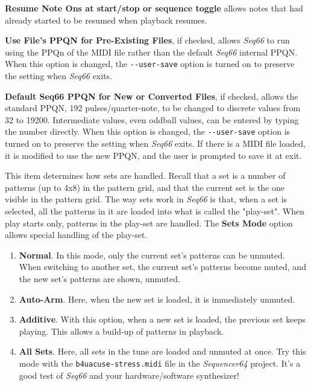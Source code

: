    \setcounter{ItemCounter}{0}      %

   \textbf{Resume Note Ons at start/stop or sequence toggle}
   allows notes that had already started
   to be resumed when playback resumes.

   \textbf{Use File's PPQN for Pre-Existing Files}, if checked, allows
   \textsl{Seq66} to run using the PPQn of the MIDI file rather than
   the default \textsl{Seq66} internal PPQN.
   When this option is changed, the \texttt{-{}-user-save} option is turned on
   to preserve the setting when \textsl{Seq66} exits.

   \textbf{Default Seq66 PPQN for New or Converted Files}, if checked, allows
   the standard PPQN, 192 pulses/quarter-note, to be changed to discrete values
   from 32 to 19200.  Intermediate values, even oddball values, can be entered
   by typing the number directly.
   When this option is changed, the \texttt{-{}-user-save} option is turned on
   to preserve the setting when \textsl{Seq66} exits.
   If there is a MIDI file loaded, it is modified to use the new PPQN, and the
   user is prompted to save it at exit.

   This item determines how sets are handled.
   Recall that a set is a number of patterns (up to 4x8) in the pattern grid,
   and that the current set is the one visible in the pattern grid.
   The way sets work in \textsl{Seq66} is that, when a set is selected,
   all the patterns in it are loaded into what is called
   the "play-set".
   When play starts only, patterns in the play-set are handled.
   The \textbf{Sets Mode} option allows special handling of the play-set.

   \begin{enumerate}
      \item \textbf{Normal}.
         In this mode, only the current set's patterns can be unmuted.
         When switching to another set, the current set's patterns become
         muted, and the new set's patterns are shown, unmuted.
      \item \textbf{Auto-Arm}.
         Here, when the new set is loaded, it is immediately unmuted.
      \item \textbf{Additive}.
         With this option, when a new set is loaded, the previous set keeps
         playing. This allows a build-up of patterns in playback.
      \item \textbf{All Sets}.
         Here, all sets in the tune are loaded and unmuted at once.
         Try this mode with the \texttt{b4uacuse-stress.midi} file
         in the \textsl{Sequencer64} project.  It's a good test of
         \textsl{Seq66} and your hardware/software synthesizer!
   \end{enumerate}

